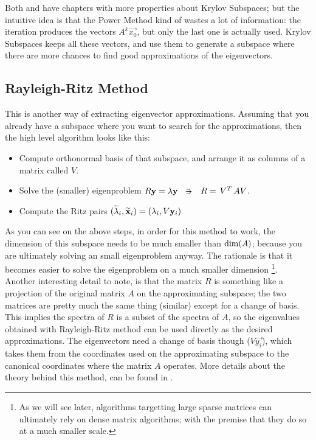 Both \cite{parlett80} and \cite{saad92} have chapters with more
properties about Krylov Subspaces; but the intuitive idea is that the
Power Method kind of wastes a lot of information: the iteration
produces the vectors $A^k\vec{x_0}$, but only the last one is actually
used. Krylov Subspaces keeps all these vectors, and use them to
generate a subspace where there are more chances to find good
approximations of the eigenvectors.

\subsection{Rayleigh-Ritz Method}

This is another way of extracting eigenvector approximations. Assuming
that you 
already have a subspace where you want to search for the
approximations, then the high level algorithm looks like this:

\begin{itemize}
  \item Compute orthonormal basis of that subspace, and arrange it as
    columns of a matrix called $V$.
  \item Solve the (smaller) eigenproblem $R\vec{y} = \lambda\vec{y}
    \ds{\suchthat} R = \trans{V} A V$. 
  \item Compute the Ritz pairs
      $(\widetilde{\lambda}_i,\widetilde{\mathbf{x}}_i) = (\lambda_i, V\mathbf{y}_i)$
\end{itemize}

As you can see on the above steps, in order for this method to work,
the dimension of this subspace  needs to be much smaller than
$\operatorname{dim}(A)$; because you are ultimately solving an small
eigenproblem anyway.  The rationale is that it becomes easier to
solve the eigenproblem on a much smaller dimension \footnote{As we
  will see later, algorithms targetting large sparse matrices can
  ultimately rely on dense matrix algorithms; with the premise that
  they do so at a much smaller scale.}. \\

Another interesting detail to note, is that the
matrix $R$ is something like a projection of the original matrix $A$
on the approximating subspace; the two matrices are pretty much the
same thing (similar) except for a change of 
basis. This implies the spectra of $R$ is a subset of the spectra of
$A$, so the eigenvalues obtained with Rayleigh-Ritz method can be used
directly as the desired approximations. The eigenvectors need a change
of basis though ($V\vec{y_i}$), which takes them from the coordinates
used on the approximating subspace to the canonical coordinates where
the matrix $A$ operates. More details about the theory behind this
method, can be found in \cite{saad92}.

